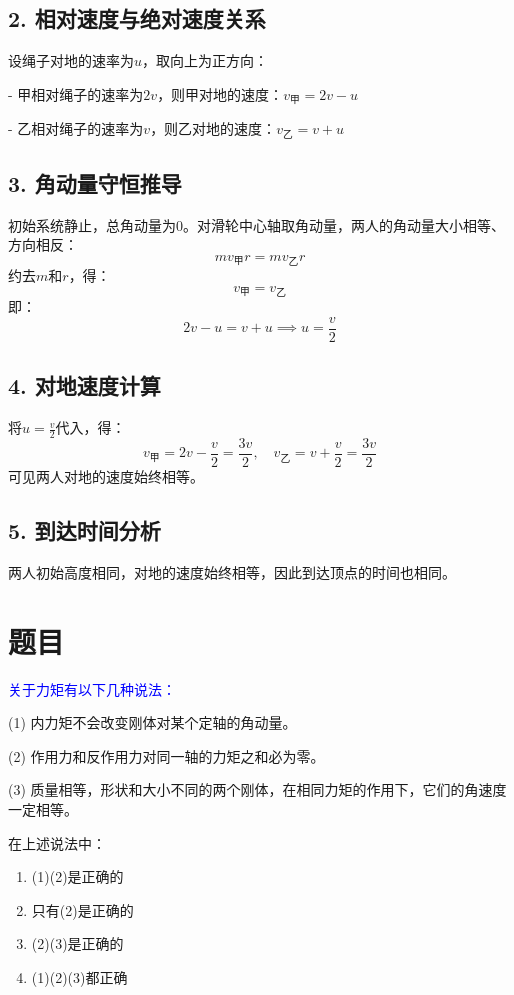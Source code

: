 \documentclass[11pt,a4paper]{article}
\begin{document}
\subsection*{2. 相对速度与绝对速度关系}
设绳子对地的速率为$u$，取向上为正方向：

- 甲相对绳子的速率为$2v$，则甲对地的速度：$v_{\text{甲}} = 2v - u$

- 乙相对绳子的速率为$v$，则乙对地的速度：$v_{\text{乙}} = v + u$

\subsection*{3. 角动量守恒推导}
初始系统静止，总角动量为0。对滑轮中心轴取角动量，两人的角动量大小相等、方向相反：
\[
m v_{\text{甲}} r = m v_{\text{乙}} r
\]
约去$m$和$r$，得：
\[
v_{\text{甲}} = v_{\text{乙}}
\]
即：
\[
2v - u = v + u \implies u = \frac{v}{2}
\]

\subsection*{4. 对地速度计算}
将$u = \frac{v}{2}$代入，得：
\[
v_{\text{甲}} = 2v - \frac{v}{2} = \frac{3v}{2}, \quad v_{\text{乙}} = v + \frac{v}{2} = \frac{3v}{2}
\]
可见两人对地的速度始终相等。

\subsection*{5. 到达时间分析}
两人初始高度相同，对地的速度始终相等，因此到达顶点的时间也相同。


\section*{题目}
\textcolor{blue}{关于力矩有以下几种说法：}

(1) 内力矩不会改变刚体对某个定轴的角动量。

(2) 作用力和反作用力对同一轴的力矩之和必为零。

(3) 质量相等，形状和大小不同的两个刚体，在相同力矩的作用下，它们的角速度一定相等。

在上述说法中：
\begin{enumerate}
    \item[A] (1)(2)是正确的
    \item[B] 只有(2)是正确的
    \item[C] (2)(3)是正确的
    \item[D] (1)(2)(3)都正确
\end{enumerate}
\end{document}
